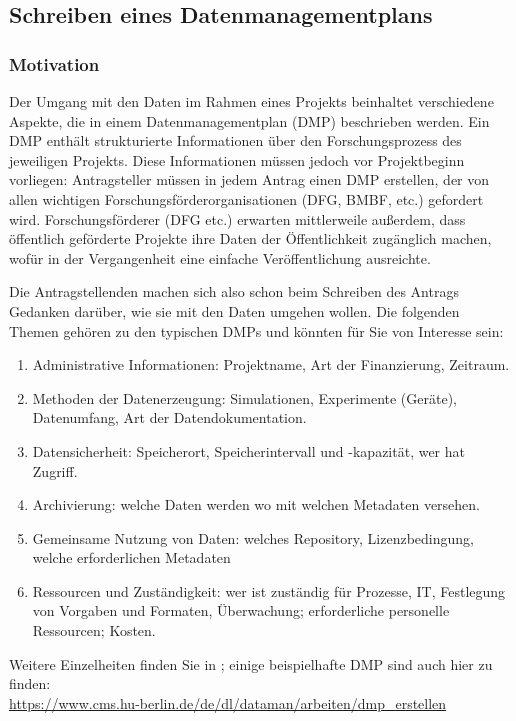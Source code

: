 \subsection{Schreiben eines Datenmanagementplans}

\subsubsection{Motivation}

Der Umgang mit den Daten im Rahmen eines Projekts beinhaltet verschiedene
Aspekte, die in einem Datenmanagementplan (DMP) beschrieben werden. Ein DMP
enthält strukturierte Informationen über den Forschungsprozess des jeweiligen
Projekts. Diese Informationen müssen jedoch vor Projektbeginn vorliegen:
Antragsteller müssen in jedem Antrag einen DMP erstellen, der von allen
wichtigen Forschungsförderorganisationen (DFG, BMBF, etc.) gefordert wird. Forschungsförderer (DFG etc.) erwarten mittlerweile außerdem, dass öffentlich geförderte
Projekte ihre Daten der Öffentlichkeit zugänglich machen, wofür in der
Vergangenheit eine einfache Veröffentlichung ausreichte.

Die Antragstellenden machen sich also schon beim Schreiben des Antrags Gedanken
darüber, wie sie mit den Daten umgehen wollen. Die folgenden Themen gehören zu
den typischen DMPs und könnten für Sie von Interesse sein:
\begin{enumerate}
	\item Administrative Informationen: Projektname, Art der Finanzierung, Zeitraum.
	\item Methoden der Datenerzeugung: Simulationen, Experimente (Geräte),
	Datenumfang, Art der Datendokumentation.
	\item Datensicherheit: Speicherort, Speicherintervall und -kapazität,
	wer hat Zugriff.
	\item Archivierung: welche Daten werden wo mit welchen Metadaten versehen.
	\item Gemeinsame Nutzung von Daten: welches Repository, Lizenzbedingung,
	welche erforderlichen Metadaten
	\item Ressourcen und Zuständigkeit: wer ist zuständig für Prozesse, IT,
	Festlegung von Vorgaben und Formaten, Überwachung; erforderliche
	personelle Ressourcen; Kosten.
\end{enumerate}
Weitere Einzelheiten finden Sie in \cite{dfg2021,hannover2020}; einige beispielhafte DMP sind auch hier zu finden: \\
\url{https://www.cms.hu-berlin.de/de/dl/dataman/arbeiten/dmp_erstellen}




